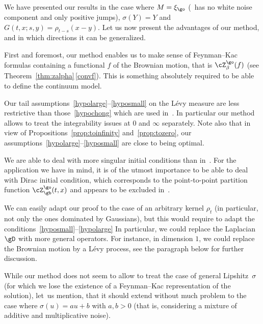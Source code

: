 We have presented our results in the case where
$M=\xi_{\go}$ (\ie ~has no white noise component and only positive jumps), $\sigma(Y)=Y$ and $G(t,x ;s,y) =\rho_{t-s}(x-y)$.
Let us now present the advantages of our method, and in which directions it can be generalized.
\begin{enumeratea}
\item
First and foremost, our method enables us to make sense of Feynman--Kac formulas containing a functional $f$ of the Brownian motion, that is $\cZ^\go_{\beta}(f)$ (see Theorem~\ref{thm:zalpha}\,\eqref{convf}). This is something absolutely required to be able to define the continuum model.

\item
Our tail assumptions~\eqref{hypolarge}--\eqref{hyposmall} on the Lévy measure are less restrictive
than those~\eqref{hypochong} which are used in~\cite{Chong17}. In particular our method allows to treat the integrability issues at $0$ and $\infty$ separately.
Note also that in view of Propositions~\ref{prop:toinfinity} and~\ref{prop:tozero}, our assumptions~\eqref{hypolarge}--\eqref{hyposmall} are close to being optimal.

\item
We are able to deal with more singular initial conditions
than in~\cite{Chong17}. For the application we have in mind, it is of the utmost importance to be able to deal with Dirac initial condition, which corresponds to the point-to-point partition function $\cZ_{\gb}^{\go}(t,x)$ and appears to be excluded in~\cite{Chong17}.

\item
We can easily adapt our proof to the case
of an arbitrary kernel $\rho_t$ (in particular, not only the ones dominated by Gaussians), but this would require to adapt
the conditions~\eqref{hyposmall}--\eqref{hypolarge}
In particular, we could replace the Laplacian $\gD$ with more general operators. For instance, in dimension $1$, we could replace the Brownian motion by a Lévy process,
see the paragraph below for further discussion.

\item
While our method does not seem to allow to treat the case of general Lipshitz~$\sigma$ (for which we lose the existence of a Feynman--Kac representation of the solution), let~us mention, that it should extend without much problem to the case where \hbox{$\sigma(u)=au+b$} with $a,b>0$ (that is, considering a mixture of additive and multiplicative noise).


\end{enumeratea}
